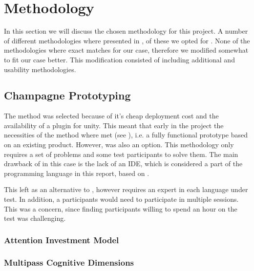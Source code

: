 \section{Methodology}
In this section we will discuss the chosen methodology for this project. A number of different methodologies where presented in , of these we opted for \champagne. None of the methodologies where exact matches for our case, therefore we modified \champagne somewhat to fit our case better. This modification consisted of including additional \attentions and \cognitive usability methodologies.

\subsection{Champagne Prototyping}
The \champagne method was selected because of it's cheap deployment cost and the availability of a \fs plugin for unity\cite{fsharp2019plugin}. This meant that early in the project the necessities of the method where met (see ), i.e. a fully functional prototype based on an existing product. However, \discount was also an option. This methodology only requires a set of problems and some test participants to solve them. The main drawback of \discount in this case is the lack of an \gls{IDE}, which is considered a part of the programming language in this report, based on \cognitive.

This left \expert as an alternative to \champagne, however \expert requires an expert in each language under test. In addition, a participants would need to participate in multiple sessions. This was a concern, since finding participants willing to spend an hour on the test was challenging.

\subsubsection{Attention Investment Model}

\subsubsection{Multipass Cognitive Dimensions}
